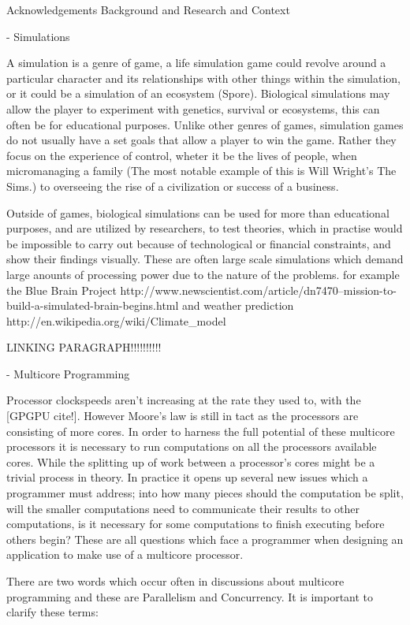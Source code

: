 \documentclass[main.tex]{subfiles}
\begin{document}

Acknowledgements
Background and Research and Context

- Simulations

A simulation is a genre of game, a life simulation game could revolve around a particular character and its relationships with other things within the simulation, or it could be a simulation of an ecosystem (Spore). Biological simulations may allow the player to experiment with genetics, survival or ecosystems, this can often be for educational purposes. Unlike other genres of games, simulation games do not usually have a set goals that allow a player to win the game. Rather they focus on the experience of control, wheter it be the lives of people, when micromanaging a family (The most notable example of this is Will Wright's The Sims.) to overseeing the rise of a civilization or success of a business. 

Outside of games, biological simulations can be used for more than educational purposes, and are utilized by researchers, to test theories, which in practise would be impossible to carry out because of technological or financial constraints, and show their findings visually. These are often large scale simulations which demand large anounts of processing power due to the nature of the problems. for example the Blue Brain Project http://www.newscientist.com/article/dn7470--mission-to-build-a-simulated-brain-begins.html and weather prediction http://en.wikipedia.org/wiki/Climate_model

LINKING PARAGRAPH!!!!!!!!!!

- Multicore Programming

Processor clockspeeds aren't increasing at the rate they used to, with the [GPGPU cite!]. However Moore's law is still in tact as the processors are consisting of more cores. In order to harness the full potential of these multicore processors it is necessary to run computations on all the processors available cores. While the splitting up of work between a processor's cores might be a trivial process in theory. In practice it opens up several new issues which a programmer must address; into how many pieces should the computation be split, will the smaller computations need to communicate their results to other computations, is it necessary for some computations to finish executing before others begin? These are all questions which face a programmer when designing an application to make use of a multicore processor. 

There are two words which occur often in discussions about multicore programming and these are Parallelism and Concurrency. It is important to clarify these terms:
\end{document}
